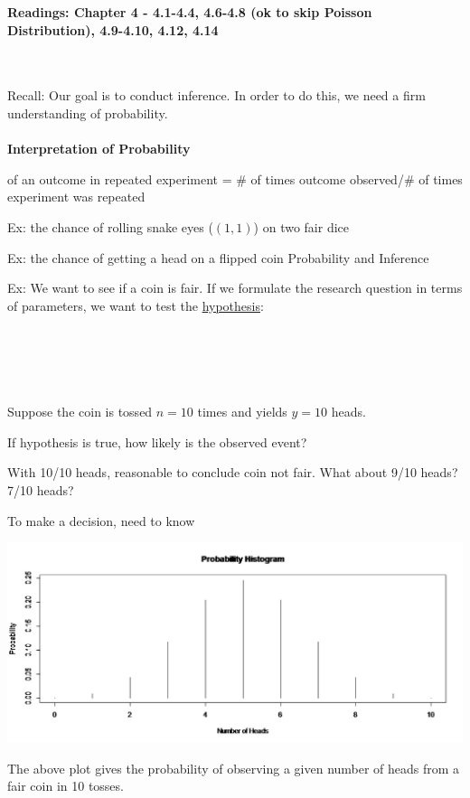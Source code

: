 \begin{center}\large\textbf{Readings: Chapter 4 - 4.1-4.4, 4.6-4.8 (ok to skip Poisson Distribution), 4.9-4.10, 4.12, 4.14}\\
\normalsize \end{center}
\large ~\hrulefill
~\\
\normalsize \\

Recall:  Our goal is to conduct inference.  In order to do this, we need a firm understanding of probability.\\~\\
\textbf{Interpretation of Probability}\\
\bi
\item \underbar{~~~~~~~~~~~~~~~~~~~~~~~~~~~~~~~~~~~~~~~~~~~~~~~~~~~~} of an outcome in repeated experiment = \# of times outcome observed/\# of times experiment was repeated
\bi
\item Ex: the chance of rolling snake eyes ($(1,1)$) on two fair dice
\item Ex: the chance of getting a head on a flipped coin
\ei
\ei
Probability and Inference
\bi
\item Ex:  We want to see if a coin is fair.  If we formulate the research question in terms of parameters, we want to test the \underline{hypothesis}:\\~\\~\\~\\~\\~\\
Suppose the coin is tossed $n=10$ times and yields $y=10$ heads. 
\bi
\item If hypothesis is true, how likely is the observed event?\\
\item With 10/10 heads, reasonable to conclude coin not fair.  What about 9/10 heads? 7/10 heads?\\
\item To make a decision, need to know \underbar{~~~~~~~~~~~~~~~~~~~~~~~~~~~~~~~~~~~~~~~~~~~~~~}
\ei
\ei
\begin{center}
\includegraphics[scale=0.35]{chapter4/binomialprobhist.jpg}
\end{center}
The above plot gives the probability of observing a given number of heads from a fair coin in 10 tosses.  \\~\\~\\~\\~\\


